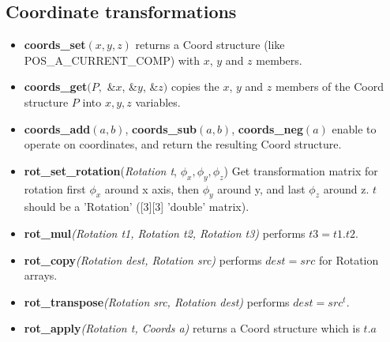 \subsection{Coordinate transformations}
\begin{itemize}
\item {\bfseries coords\_set}$(x,y,z)$ returns a Coord structure (like POS\_A\_CURRENT\_COMP) with $x$, $y$ and $z$ members.
\item {\bfseries  coords\_get}$(P,$ \&$x$, \&$y$, \&$z)$ copies the $x$, $y$ and
$z$ members of the Coord structure $P$ into $x,y,z$ variables.
\item {\bfseries coords\_add}$(a,b)$, {\bfseries coords\_sub}$(a,b)$, {\bfseries
coords\_neg}$(a)$ enable to  operate on coordinates, and return the
resulting Coord structure.
\item {\bfseries rot\_set\_rotation}(\textit{Rotation t}, $\phi_x, \phi_y, \phi_z$)
  Get transformation matrix for rotation
  first $\phi_x$ around x axis, then $\phi_y$ around y,
  and last $\phi_z$ around z. $t$ should be a 'Rotation' ([3][3] 'double' matrix).
\item {\bfseries rot\_mul}\textit{(Rotation t1, Rotation t2, Rotation t3)} performs $t3 = t1 . t2$.
\item {\bfseries rot\_copy}\textit{(Rotation dest, Rotation src)} performs $dest = src$ for Rotation arrays.
\item {\bfseries rot\_transpose}\textit{(Rotation src, Rotation dest)} performs $dest = src^t$.
\item {\bfseries rot\_apply}\textit{(Rotation t, Coords a)} returns a Coord structure which is $t.a$
\end{itemize}

